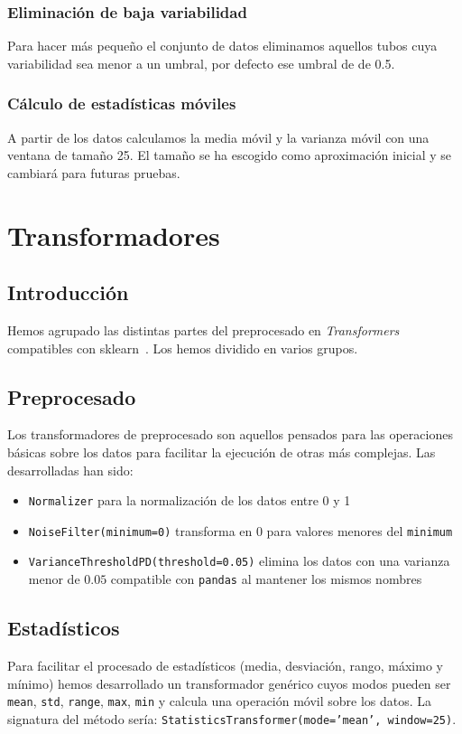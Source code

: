 \documentclass[a4paper,12pt,twoside,oldfontcommands]{memoir}
\begin{document}
\subsection{Eliminación de baja variabilidad}
Para hacer más pequeño el conjunto de datos eliminamos aquellos tubos cuya variabilidad sea menor a un umbral, por defecto ese umbral de de 0.5.
\subsection{Cálculo de estadísticas móviles}
A partir de los datos calculamos la media móvil y la varianza móvil con una ventana de tamaño 25. El tamaño se ha escogido como aproximación inicial y se cambiará para futuras pruebas. 

\chapter{Transformadores}
\section{Introducción}
Hemos agrupado las distintas partes del preprocesado en \textit{Transformers} compatibles con sklearn~\cite{dreisbach_2015}. Los hemos dividido en varios grupos.
\section{Preprocesado}
Los transformadores de preprocesado son aquellos pensados para las operaciones básicas sobre los datos para facilitar la ejecución de otras más complejas. Las desarrolladas han sido:
\begin{itemize}
\item \texttt{Normalizer} para la normalización de los datos entre 0 y 1
\item \texttt{NoiseFilter(minimum=0)} transforma en 0 para valores menores del \texttt{minimum}
\item \texttt{VarianceThresholdPD(threshold=0.05)} elimina los datos con una varianza menor de \(0.05\) compatible con \texttt{pandas} al mantener los mismos nombres
\end{itemize}
\section{Estadísticos}
Para facilitar el procesado de estadísticos (media, desviación, rango, máximo y mínimo) hemos desarrollado un transformador genérico cuyos modos pueden ser \texttt{mean}, \texttt{std}, \texttt{range}, \texttt{max}, \texttt{min} y calcula una operación móvil sobre los datos. La signatura del método sería: \texttt{StatisticsTransformer(mode='mean', window=25)}.
\end{document}
